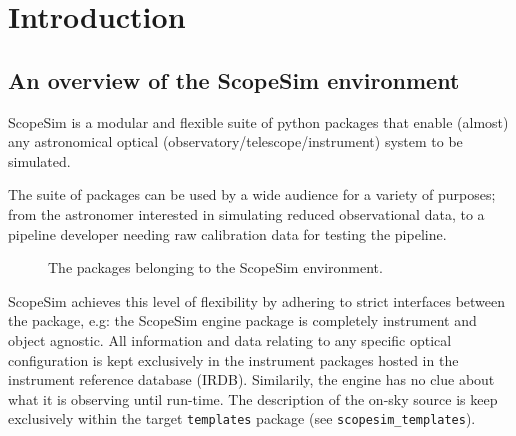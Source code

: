 

\section{Introduction%
  \label{introduction}%
}


\subsection{An overview of the ScopeSim environment%
  \label{an-overview-of-the-scopesim-environment}%
}

ScopeSim is a modular and flexible suite of python packages that enable (almost) any astronomical optical (observatory/telescope/instrument) system to be simulated.

The suite of packages can be used by a wide audience for a variety of purposes; from the astronomer interested in simulating reduced observational data, to a pipeline developer needing raw calibration data for testing the pipeline.

\begin{figure}
\noindent{}\label{fig-scopesim-environment}

\caption{The packages belonging to the ScopeSim environment.}
\end{figure}

ScopeSim achieves this level of flexibility by adhering to strict interfaces between the package, e.g: the ScopeSim engine package is completely instrument and object agnostic.
All information and data relating to any specific optical configuration is kept exclusively in the instrument packages hosted in the instrument reference database (IRDB).
Similarily, the engine has no clue about what it is observing until run-time.
The description of the on-sky source is keep exclusively within the target \texttt{templates} package (see \texttt{scopesim\_templates}).

